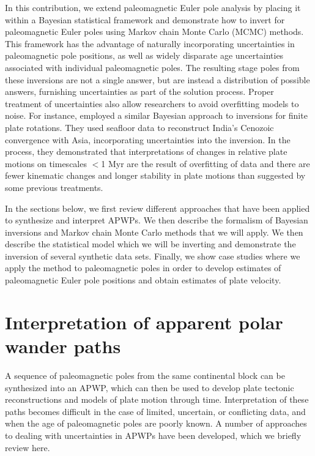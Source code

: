 \documentclass[11pt,letterpaper]{article}
\begin{document}
In this contribution, we extend paleomagnetic Euler pole analysis by placing it within a Bayesian statistical framework and demonstrate how to invert for paleomagnetic Euler poles using Markov chain Monte Carlo (MCMC) methods. This framework has the advantage of naturally incorporating uncertainties in paleomagnetic pole positions, as well as widely disparate age uncertainties associated with individual paleomagnetic poles. The resulting stage poles from these inversions are not a single answer, but are instead a distribution of possible answers, furnishing uncertainties as part of the solution process. Proper treatment of uncertainties also allow researchers to avoid overfitting models to noise. For instance, \cite{Iaffaldano2012a} employed a similar Bayesian approach to inversions for finite plate rotations. They used seafloor data to reconstruct India's Cenozoic convergence with Asia, incorporating uncertainties into the inversion. In the process, they demonstrated that interpretations of changes in relative plate motions on timescales $<$1 Myr are the result of overfitting of data and there are fewer kinematic changes and longer stability in plate motions than suggested by some previous treatments.

In the sections below, we first review different approaches that have been applied to synthesize and interpret APWPs. We then describe the formalism of Bayesian inversions and Markov chain Monte Carlo methods that we will apply. We then describe the statistical model which we will be inverting and demonstrate the inversion of several synthetic data sets. Finally, we show case studies where we apply the method to paleomagnetic poles in order to develop estimates of paleomagnetic Euler pole positions and obtain estimates of plate velocity.

\section*{Interpretation of apparent polar wander paths}

A sequence of paleomagnetic poles from the same continental block can be synthesized into an APWP, which can then be used to develop plate tectonic reconstructions and models of plate motion through time. Interpretation of these paths becomes difficult in the case of limited, uncertain, or conflicting data, and when the age of paleomagnetic poles are poorly known. A number of approaches to dealing with uncertainties in APWPs have been developed, which we briefly review here.
\end{document}
